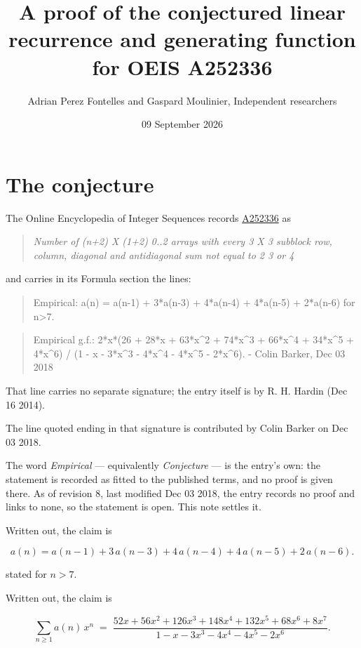 \documentclass[11pt]{article}
\title{A proof of the conjectured linear recurrence and generating function for OEIS A252336}
\author{Adrian Perez Fontelles and Gaspard Moulinier, Independent researchers}
\date{09 September 2026}
\theoremstyle{definition}
\begin{document}
\maketitle
\section{The conjecture}

The Online Encyclopedia of Integer Sequences records \href{https://oeis.org/A252336}{A252336} as

\begin{quote}\itshape Number of (n+2) X (1+2) 0..2 arrays with every 3 X 3 subblock row, column, diagonal and antidiagonal sum not equal to 2 3 or 4\end{quote}

and carries in its Formula section the lines:

\begin{quote}\ttfamily Empirical: a(n) = a(n-1) + 3*a(n-3) + 4*a(n-4) + 4*a(n-5) + 2*a(n-6) for n>7.\end{quote}

\begin{quote}\ttfamily Empirical g.f.: 2*x*(26 + 28*x + 63*x\textasciicircum{}2 + 74*x\textasciicircum{}3 + 66*x\textasciicircum{}4 + 34*x\textasciicircum{}5 + 4*x\textasciicircum{}6) / (1 - x - 3*x\textasciicircum{}3 - 4*x\textasciicircum{}4 - 4*x\textasciicircum{}5 - 2*x\textasciicircum{}6). - Colin Barker, Dec 03 2018\end{quote}

That line carries no separate signature; the entry itself is by R. H. Hardin (Dec 16 2014).

The line quoted ending in that signature is contributed by Colin Barker on Dec 03 2018.

The word {\itshape Empirical} --- equivalently {\itshape Conjecture} --- is the entry's own: the statement is recorded as fitted to the published terms, and no proof is given there. As of revision 8, last modified Dec 03 2018, the entry records no proof and links to none, so the statement is open. This note settles it.

Written out, the claim is

\[a(n) = a(n-1) + 3\,a(n-3) + 4\,a(n-4) + 4\,a(n-5) + 2\,a(n-6).\]

stated for $n > 7$.

Written out, the claim is

\[\sum_{n \ge 1} a(n)\,x^n \;=\; \frac{52x + 56x^{2} + 126x^{3} + 148x^{4} + 132x^{5} + 68x^{6} + 8x^{7}}{1 - x - 3x^{3} - 4x^{4} - 4x^{5} - 2x^{6}}.\]
\end{document}
